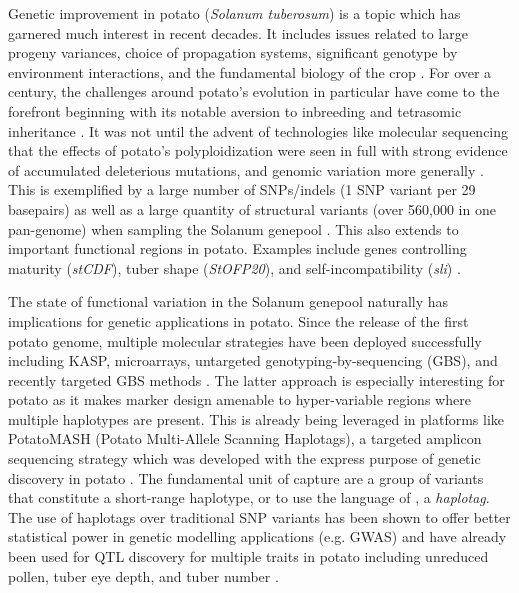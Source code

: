 \begin{refsection}
Genetic improvement in potato (\emph{Solanum tuberosum}) is a topic
which has garnered much interest in recent decades. It includes issues related to large progeny variances,
choice of propagation systems, significant genotype by environment
interactions, and the fundamental biology of the crop
\parencite{Mendoza1974,Tai1979,Almekinders2009}. For over a century, the
challenges around potato's evolution in particular have come to the
forefront beginning with its notable aversion to inbreeding and
tetrasomic inheritance \parencite{Krantz1924,Swaminathan1954}. It was not
until the advent of technologies like molecular sequencing that the
effects of potato's polyploidization were seen in full with strong
evidence of accumulated deleterious mutations, and genomic variation
more generally
\parencite{Lian2019,Hardigan2016,Marand2019,Kyriakidou2020}. This is
exemplified by a large number of SNPs/indels (1 SNP variant per 29
basepairs) as well as a large quantity of structural variants (over
560,000 in one pan-genome) when sampling the Solanum genepool
\parencite{ThePotatoGenomeSequencingConsortium2011,Tang2022}. This also
extends to important functional regions in potato. Examples include
genes controlling maturity (\emph{stCDF}), tuber shape (\emph{StOFP20}),
and self-incompatibility (\emph{sli})
\parencite{Kloosterman2013,Eck2022,Ames2024}.

The state of functional variation in the Solanum genepool naturally has
implications for genetic applications in potato. Since the release of
the first potato genome, multiple molecular strategies have been
deployed successfully including KASP, microarrays, untargeted
genotyping-by-sequencing (GBS), and recently targeted GBS methods
\parencite{Vos2015,Meijer2018,Wilson2021,Endelman2024}. The latter
approach is especially interesting for potato as it makes marker design
amenable to hyper-variable regions where multiple haplotypes are
present. This is already being leveraged in platforms like PotatoMASH
(Potato Multi-Allele Scanning Haplotags), a targeted amplicon sequencing
strategy which was developed with the express purpose of genetic
discovery in potato \parencite{Leyva-Perez2022}. The fundamental unit of
capture are a group of variants that constitute a short-range
haplotype, or to use the language of \parencite{Tinker2016}, a
\emph{haplotag}. The use of haplotags over traditional SNP variants has
been shown to offer better statistical power in genetic modelling
applications (e.g. GWAS) and have already been used for QTL discovery
for multiple traits in potato including unreduced pollen, tuber eye
depth, and tuber number
\parencite{ThereseNavarro2022,Clot2024,Vexler2024}.


\end{refsection}
